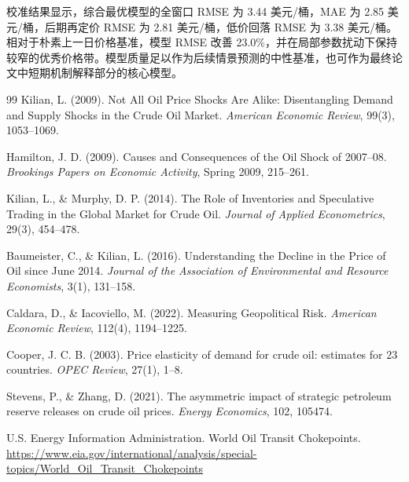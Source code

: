 \documentclass[UTF8,zihao=-4,fontset=fandol]{ctexart}
\begin{document}
校准结果显示，综合最优模型的全窗口 RMSE 为 3.44 美元/桶，MAE 为 2.85 美元/桶，后期再定价 RMSE 为 2.81 美元/桶，低价回落 RMSE 为 3.38 美元/桶。相对于朴素上一日价格基准，模型 RMSE 改善 23.0\%，并在局部参数扰动下保持较窄的优秀价格带。模型质量足以作为后续情景预测的中性基准，也可作为最终论文中短期机制解释部分的核心模型。

\begin{thebibliography}{99}
Kilian, L. (2009). Not All Oil Price Shocks Are Alike: Disentangling Demand and Supply Shocks in the Crude Oil Market. \textit{American Economic Review}, 99(3), 1053--1069.

Hamilton, J. D. (2009). Causes and Consequences of the Oil Shock of 2007--08. \textit{Brookings Papers on Economic Activity}, Spring 2009, 215--261.

Kilian, L., \& Murphy, D. P. (2014). The Role of Inventories and Speculative Trading in the Global Market for Crude Oil. \textit{Journal of Applied Econometrics}, 29(3), 454--478.

Baumeister, C., \& Kilian, L. (2016). Understanding the Decline in the Price of Oil since June 2014. \textit{Journal of the Association of Environmental and Resource Economists}, 3(1), 131--158.

Caldara, D., \& Iacoviello, M. (2022). Measuring Geopolitical Risk. \textit{American Economic Review}, 112(4), 1194--1225.

Cooper, J. C. B. (2003). Price elasticity of demand for crude oil: estimates for 23 countries. \textit{OPEC Review}, 27(1), 1--8.

Stevens, P., \& Zhang, D. (2021). The asymmetric impact of strategic petroleum reserve releases on crude oil prices. \textit{Energy Economics}, 102, 105474.

U.S. Energy Information Administration. World Oil Transit Chokepoints.
\url{https://www.eia.gov/international/analysis/special-topics/World_Oil_Transit_Chokepoints}
\end{thebibliography}
\end{document}
